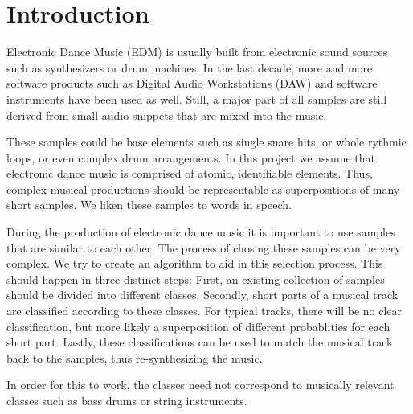 \section{Introduction}
\label{sec:Introduction}

Electronic Dance Music (EDM) is usually built from electronic sound sources such as synthesizers or drum machines. In the last decade, more and more software products such as Digital Audio Workstations (DAW) and software instruments have been used as well. Still, a major part of all samples are still derived from small audio snippets that are mixed into the music.

These samples could be base elements such as single snare hits, or whole rythmic loops, or even complex drum arrangements. In this project we assume that electronic dance music is comprised of atomic, identifiable elements. Thus, complex musical productions should be representable as superpositions of many short samples. We liken these samples to words in speech.

During the production of electronic dance music it is important to use samples that are similar to each other. The process of chosing these samples can be very complex. We try to create an algorithm to aid in this selection process. This should happen in three distinct steps: First, an existing collection of samples should be divided into different classes. Secondly, short parts of a musical track are classified according to these classes. For typical tracks, there will be no clear classification, but more likely a superposition of different probablities for each short part. Lastly, these classifications can be used to match the musical track back to the samples, thus re-synthesizing the music.

In order for this to work, the classes need not correspond to musically relevant classes such as bass drums or string instruments.
